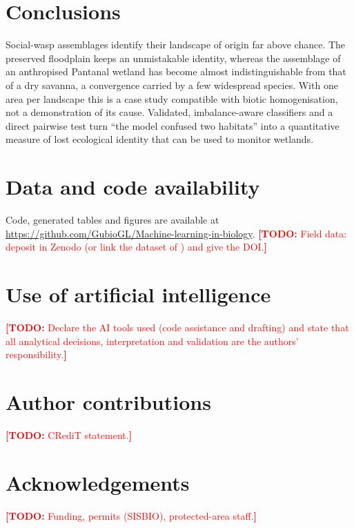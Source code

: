 \documentclass[10pt,a4paper,twocolumn]{article}
\newif\ifshowtodos \showtodostrue
\newcommand{\TODO}[1]{\ifshowtodos\textcolor{red}{\textbf{[TODO:} #1\textbf{]}}\fi}
\begin{document}
\section{Conclusions}\label{sec:conclusions}
Social-wasp assemblages identify their landscape of origin far above chance. The preserved floodplain
keeps an unmistakable identity, whereas the assemblage of an anthropised Pantanal wetland has become
almost indistinguishable from that of a dry savanna, a convergence carried by a few widespread
species. With one area per landscape this is a case study compatible with biotic homogenisation, not
a demonstration of its cause. Validated, imbalance-aware classifiers and a direct pairwise test turn
``the model confused two habitats'' into a quantitative measure of lost ecological identity that can
be used to monitor wetlands.

\section*{Data and code availability}
Code, generated tables and figures are available at
\url{https://github.com/GubioGL/Machine-learning-in-biology}.
\TODO{Field data: deposit in Zenodo (or link the dataset of \citet{leite_companion}) and give the DOI.}

\section*{Use of artificial intelligence}
\TODO{Declare the AI tools used (code assistance and drafting) and state that all analytical decisions,
interpretation and validation are the authors' responsibility.}

\section*{Author contributions}
\TODO{CRediT statement.}

\section*{Acknowledgements}
\TODO{Funding, permits (SISBIO), protected-area staff.}


{\small}
\end{document}
